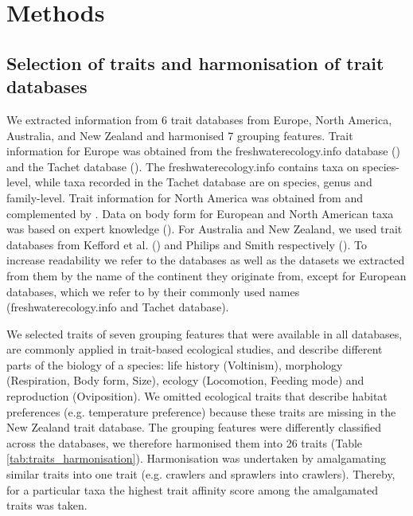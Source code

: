 \documentclass{article}
\begin{document}
\newpage

\section*{Methods}

\subsection*{Selection of traits and harmonisation of trait databases}

We extracted information from 6 trait databases from Europe, North America, Australia, and New Zealand and harmonised 7 grouping features. Trait information for Europe was obtained from the freshwaterecology.info database (\cite{schmidt-kloiber_www.freshwaterecology.info_2015}) and the Tachet database (\cite{usseglio-polatera_biomonitoring_2000}). The freshwaterecology.info contains taxa on species-level, while taxa recorded in the Tachet database are on species, genus and family-level. Trait information for North America was obtained from \citet{twardochleb_trait_data_2020} and complemented by \citet{vieira_database_nodate}. Data on body form for European and North American taxa was based on expert knowledge (\cite{polatera_personal_information_2020}). For Australia and New Zealand, we used trait databases from Kefford et al. (\cite{kefford_integrated_2020}) and Philips and Smith respectively (\cite{Philips_and_Smith_NZ_DB_2018}). To increase readability we refer to the databases as well as the datasets we extracted from them by the name of the continent they originate from, except for European databases, which we refer to by their commonly used names (freshwaterecology.info and Tachet database). 
 
We selected traits of seven grouping features that were available in all databases, are commonly applied in trait-based ecological studies, and describe different parts of the biology of a species: life history (Voltinism), morphology (Respiration, Body form, Size), ecology (Locomotion, Feeding mode) and reproduction (Oviposition). We omitted ecological traits that describe habitat preferences (e.g. temperature preference) because these traits are missing in the New Zealand trait database. The grouping features were differently classified across the databases, we therefore harmonised them into 26 traits (Table \ref{tab:traits_harmonisation}). Harmonisation was undertaken by amalgamating similar traits into one trait (e.g. crawlers and sprawlers into crawlers). Thereby, for a particular taxa the highest trait affinity score among the amalgamated traits was taken. 
\end{document}
